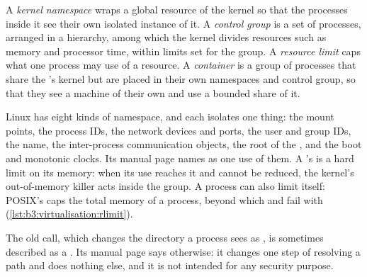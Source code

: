 \begin{definition}\label{def:b3:virtualisation:container}
A \emph{kernel namespace} wraps a global resource of the kernel so that the processes inside it see their own isolated instance of it. A \emph{control group} is a set of processes, arranged in a hierarchy, among which the kernel divides resources such as memory and processor time, within limits set for the group. A \emph{resource limit} caps what one process may use of a resource. A \emph{container} is a group of processes that share the 's kernel but are placed in their own namespaces and control group, so that they see a machine of their own and use a bounded share of it.
\end{definition}

Linux has eight kinds of namespace, and each isolates one thing: the mount points, the process IDs, the network devices and ports, the user and group IDs, the  name, the inter-process communication objects, the root of the , and the boot and monotonic clocks. Its manual page names  as one use of them. %
A 's  is a hard limit on its memory: when its use reaches it and cannot be reduced, the kernel's out-of-memory killer acts inside the group. %
A process can also limit itself: POSIX's  caps the total memory of a process, beyond which  and  fail with  (\cref{lst:b3:virtualisation:rlimit}). %

\label{lst:b3:virtualisation:rlimit}

\label{out:b3:virtualisation:rlimit}

The old  call, which changes the directory a process sees as \code{/}, is sometimes described as a . Its manual page says otherwise: it changes one step of resolving a path and does nothing else, and it is not intended for any security purpose. %


